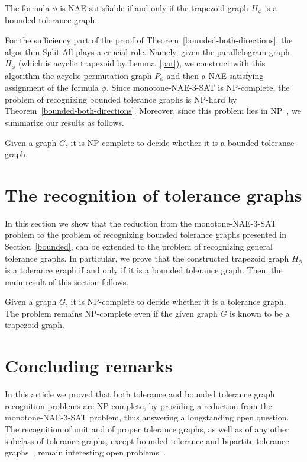 \documentclass[proceedings]{stacs}
\begin{document}
\begin{theorem}
\label{bounded-both-directions}The formula $\phi$ is NAE-satisfiable if and
only if the trapezoid graph $H_{\phi}$ is a bounded tolerance graph.
\end{theorem}

For the sufficiency part of the proof of Theorem~\ref{bounded-both-directions},
the algorithm Split-All plays a crucial role. Namely, given the parallelogram graph $H_{\phi}$ 
(which is acyclic trapezoid by Lemma~\ref{par}), 
we construct with this algorithm the acyclic permutation graph $P_{\phi}$ 
and then a NAE-satisfying assignment of the formula $\phi$. 
Since monotone-NAE-3-SAT is NP-complete, the problem of recognizing 
bounded tolerance graphs is NP-hard by Theorem~\ref{bounded-both-directions}. 
Moreover, since this problem lies in NP~\cite{HaSh04}, 
we summarize our results as follows.
\begin{theorem}
\label{bounded-tolerance}Given a graph $G$, it is NP-complete to decide
whether it is a bounded tolerance graph.
\end{theorem}


\section{The recognition of tolerance graphs\label{unbounded}}

In this section we show that the reduction from the monotone-NAE-3-SAT
problem to the problem of recognizing bounded tolerance graphs presented in
Section~\ref{bounded}, can be extended to the problem of recognizing general
tolerance graphs. In particular, we prove that the constructed trapezoid graph 
$H_{\phi}$ is a tolerance graph if and only if it is a bounded tolerance graph. 
Then, the main result of this section follows.

\begin{theorem}
\label{tolerance}Given a graph $G$, it is NP-complete to decide whether it
is a tolerance graph. The problem remains NP-complete even if the given
graph $G$ is known to be a trapezoid graph.
\end{theorem}


\section{Concluding remarks\label{conclusions}}
In this article we proved that both tolerance and bounded tolerance graph
recognition problems are NP-complete, by providing a reduction from the
monotone-NAE-3-SAT problem, thus answering a longstanding open question.
The recognition of unit and of proper tolerance graphs, as well as of 
any other subclass of tolerance graphs, except bounded tolerance and 
bipartite tolerance graphs~\cite{BuIs07}, remain interesting open 
problems~\cite{GolTol04}.

{\footnotesize 

 
}
\vspace{-1cm}
\end{document}
